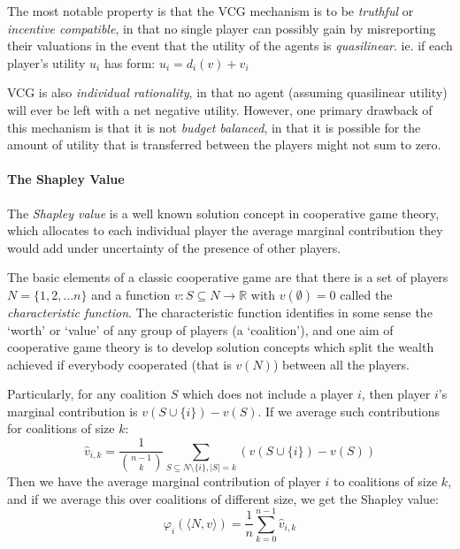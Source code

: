 \documentclass[
10pt, %
a4paper, %
oneside, %
headinclude,footinclude, %
BCOR5mm, %
]{scrartcl}
\begin{document}
The most notable property is that the VCG mechanism is to be \textit{truthful} or \textit{incentive compatible}, in that no single player can possibly gain by misreporting their valuations in the event that the utility of the agents is \textit{quasilinear}.\cite{roberts1979characterization, Lavi2008} 
ie. if each player's utility $u_i$ has form:
$ u_i = d_i(v)+v_i $

VCG is also \textit{individual rationality}, in that no agent (assuming quasilinear utility) will ever be left with a net negative utility.
However, one primary drawback of this mechanism is that it is not \textit{budget balanced}, in that it is possible for the amount of utility that is transferred between the players might not sum to zero.


\paragraph{The Shapley Value}

The \textit{Shapley value} is a well known solution concept in cooperative game theory, which allocates to each individual player the average marginal contribution they would add under uncertainty of the presence of other players.

The basic elements of a classic cooperative game are that there is a set of players$N=\{1,2,\dots n\}$ and a function $v: S\subseteq N \rightarrow \mathbb{R}$ with $v(\emptyset)=0$ called the \textit{characteristic function}.
The characteristic function identifies in some sense the `worth' or `value' of any group of players (a `coalition'), and one aim of cooperative game theory is to develop solution concepts which split the wealth achieved if everybody cooperated (that is $v(N)$) between all the players.

Particularly, for any coalition $S$ which does not include a player $i$, then player $i$'s marginal contribution is $v(S\cup\{i\}) - v(S)$. If we average such contributions for coalitions of size $k$:
\begin{equation}\label{shapley_value1}
\hat{v}_{i,k} = \frac{1}{\binom{n-1}{k}}\sum_{S\subseteq N\setminus \{ i\} , |S|=k} %
(v(S\cup\{i\})-v(S))
\end{equation}
Then we have the average marginal contribution of player $i$ to coalitions of size $k$, and if we average this over coalitions of different size, we get the Shapley value:
\begin{equation}\label{shapley_value2} \varphi_i(\langle N,v\rangle) = \frac{1}{n}\sum_{k=0}^{n-1}\hat{v}_{i,k} \end{equation}
\end{document}
